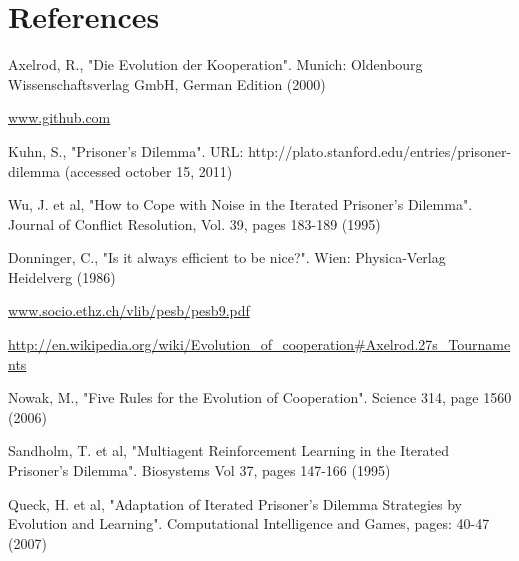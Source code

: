 \section{References}

\renewcommand{\refname}{}

\begin{thebibliography}{99}
		Axelrod, R., "Die Evolution der Kooperation". Munich: Oldenbourg Wissenschaftsverlag GmbH, German Edition (2000)

		\url{www.github.com}

		Kuhn, S., "Prisoner's Dilemma". URL: http://plato.stanford.edu/entries/prisoner-dilemma (accessed october 15, 2011)



		Wu, J. et al, "How to Cope with Noise in the Iterated Prisoner's Dilemma". Journal of Conflict Resolution, Vol. 39, pages 183-189 (1995)

		Donninger, C., "Is it always efficient to be nice?". Wien: Physica-Verlag Heidelverg (1986)

		\url{www.socio.ethz.ch/vlib/pesb/pesb9.pdf}

		\url{http://en.wikipedia.org/wiki/Evolution_of_cooperation#Axelrod.27s_Tournaments}




		Nowak, M., "Five Rules for the Evolution of Cooperation".  Science 314, page 1560 (2006)





		Sandholm, T. et al, "Multiagent Reinforcement Learning in the Iterated Prisoner's Dilemma". Biosystems Vol 37, pages 147-166 (1995)

		Queck, H. et al, "Adaptation of Iterated Prisoner's Dilemma Strategies by Evolution and Learning". Computational Intelligence and Games, pages: 40-47 (2007)





\end{thebibliography}